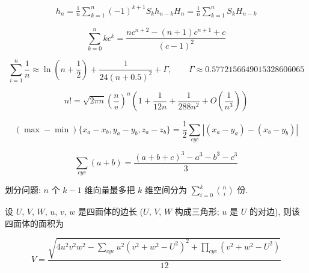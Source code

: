 \begin{eqnarray}
    h_n = \frac{1}{n}\sum_{k=1}^n(-1)^{k+1}S_kh_{n-k}
    H_n = \frac{1}{n}\sum_{k=1}^nS_kH_{n-k}
\end{eqnarray}

\begin{equation}
    \sum_{k=0}^nkc^k = \frac{nc^{n+2}-(n+1)c^{n+1}+c}{(c-1)^2}
\end{equation}

\begin{equation}
    \sum_{i=1}^n\frac{1}{n}\approx\ln\left(n + \frac 1 2\right) + \frac{1}{24(n+0.5)^2}+\Gamma,\qquad \Gamma\approx0.5772156649015328606065
\end{equation}

\begin{equation}
    n! = \sqrt{2\pi n}\left(\frac{n}{\mathrm{e}}\right)^n\left(1+\frac{1}{12n}+\frac{1}{288n^2}+O\left(\frac{1}{n^3}\right)\right)
\end{equation}

\begin{equation}
    (\max-\min){\{x_a-x_b, y_a-y_b, z_a-z_b\}} = \frac{1}{2}\sum_{cyc}\left| (x_a-y_a)-(x_b-y_b) \right|
\end{equation}

\begin{equation}
    \sum_{cyc}(a+b) = \frac{(a+b+c)^3 - a^3 - b^3 - c^3}{3}
\end{equation}

划分问题: \(n\) 个 \(k-1\) 维向量最多把 \(k\) 维空间分为 \(\sum_{i=0}^{k}\binom{n}{i}\) 份.

设 \(U\), \(V\), \(W\), \(u\), \(v\), \(w\) 是四面体的边长 (\(U\), \(V\), \(W\) 构成三角形; \(u\) 是 \(U\) 的对边), 则该四面体的面积为

\begin{equation}
    V = \frac{\sqrt{ 4u^2v^2w^2 - \sum_{cyc}{u^2(v^2+w^2-U^2)^2} + \prod_{cyc}{(v^2+w^2-U^2)} }}{12}
\end{equation}
